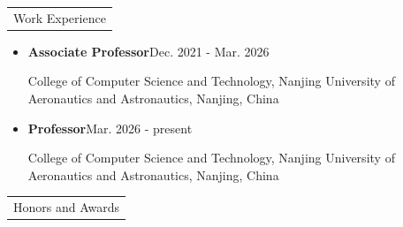 \documentclass{article}
\renewcommand{\section}[1]{%
  \begin{tabular}{p{\dimexpr\linewidth-2\tabcolsep}}
    \cellcolor{black!10}\large\strut #1
  \end{tabular}%
}
\newcommand{\heading}[2][\relax]{\textbf{#2}\hfill#1\par\nobreak}
\begin{document}
\section{Work Experience}
\begin{itemize}
  \item \heading[Dec. 2021 - Mar. 2026]{Associate Professor}
    College of Computer Science and Technology, Nanjing University of Aeronautics and Astronautics, Nanjing, China
    \item \heading[Mar. 2026 - present]{Professor}
    College of Computer Science and Technology, Nanjing University of Aeronautics and Astronautics, Nanjing, China
\end{itemize}

\section{Honors and Awards}
\end{document}
